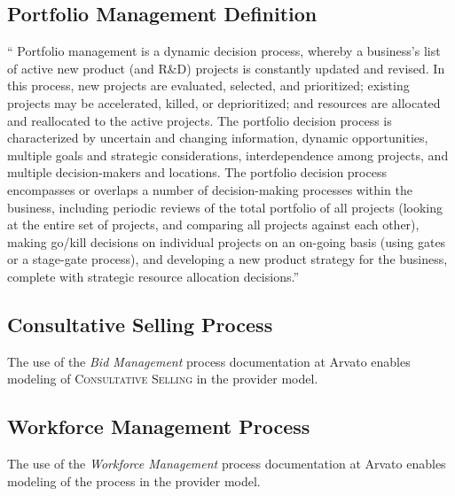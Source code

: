 \subsection{Portfolio Management Definition}
\label{app:pmdef}
\enquote{
Portfolio management is a dynamic decision process, whereby a business's list of active new product (and R\&D) projects is constantly updated and revised. In this process, new projects are evaluated, selected, and prioritized; existing projects may be accelerated, killed, or deprioritized; and resources are allocated and reallocated to the active projects. The portfolio decision process is characterized by uncertain and changing information, dynamic opportunities, multiple goals and strategic considerations, interdependence among projects, and multiple decision-makers and locations.
The portfolio decision process encompasses or overlaps a number of decision-making processes within the business, including periodic reviews of the total portfolio of all projects (looking at the entire set of projects, and comparing all projects against each other), making go/kill decisions on individual projects on an on-going basis (using gates or a stage-gate process), and developing a new product strategy for the business, complete with strategic resource allocation decisions.}  \citep[]{cooper1999new}

\subsection{Consultative Selling Process}
\label{app:salesbb}
The use of the \textit{Bid Management} process documentation at Arvato enables modeling of \textsc{Consultative Selling} in the provider model. 


\subsection{Workforce Management Process}
\label{app:wfm}
The use of the \textit{Workforce Management} process documentation at Arvato enables modeling of the process in the provider model. 


